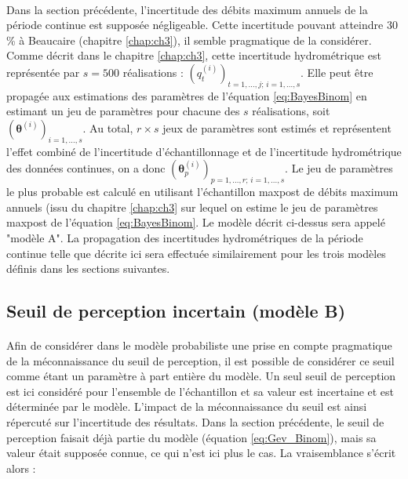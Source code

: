 	\paragraph{} Dans la section précédente, l'incertitude des débits maximum annuels de la période continue est supposée négligeable. Cette incertitude pouvant atteindre 30 \% à Beaucaire (chapitre \ref{chap:ch3}), il semble pragmatique de la considérer. Comme décrit dans le chapitre \ref{chap:ch3}, cette incertitude hydrométrique est représentée par $s = 500$ réalisations : $(q_t^{(i)})_{t=1,...,j;\,i=1,...,s}$. Elle peut être propagée aux estimations des paramètres de l'équation \ref{eq:BayesBinom} en estimant un jeu de paramètres pour chacune des $s$ réalisations, soit $(\boldsymbol{\theta}
	^{(i)})_{i=1,...,s}$. Au total, $r \times s$ jeux de paramètres sont estimés et représentent l'effet combiné de l'incertitude d'échantillonnage et de l'incertitude hydrométrique des données continues, on a donc $(\boldsymbol{\theta}^{(i)}_p)_{p=1,...,r;\, i=1,...,s}$. Le jeu de paramètres le plus probable est calculé en utilisant l'échantillon maxpost de débits maximum annuels (issu du chapitre \ref{chap:ch3} sur lequel on estime le jeu de paramètres maxpost de l'équation \ref{eq:BayesBinom}. Le modèle décrit ci-dessus sera appelé "modèle A". La propagation des incertitudes hydrométriques de la période continue telle que décrite ici sera effectuée similairement pour les trois modèles définis dans les sections suivantes.
	
	\subsection{Seuil de perception incertain (modèle B)}
	\label{subsec:modB}
	
		\paragraph{}
		Afin de considérer dans le modèle probabiliste une prise en compte pragmatique de la méconnaissance du seuil de perception, il est possible de considérer ce seuil comme étant un paramètre à part entière du modèle. Un seul seuil de perception est ici considéré pour l'ensemble de l'échantillon et sa valeur est incertaine et est déterminée par le modèle. L'impact de la méconnaissance du seuil est ainsi répercuté sur l'incertitude des résultats. Dans la section précédente, le seuil de perception faisait déjà partie du modèle (équation \ref{eq:Gev_Binom}), mais sa valeur était supposée connue, ce qui n'est ici plus le cas. La vraisemblance s'écrit alors : 
		
